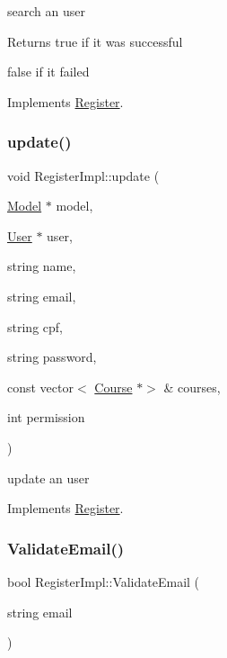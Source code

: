 search an user 

\begin{DoxyReturn}{Returns}
true if it was successful 

false if it failed 
\end{DoxyReturn}


Implements \hyperlink{classRegister_a243b58e5f1747437bab5175927cce26f}{Register}.

\mbox{\label{classRegisterImpl_a5ae0846ac09fe620501b94f5e05bcd9d}} 
\subsubsection{\texorpdfstring{update()}{update()}}
{\footnotesize\ttfamily void Register\+Impl\+::update (\begin{DoxyParamCaption}\item[{\hyperlink{classModel}{Model} $\ast$}]{model,  }\item[{\hyperlink{classUser}{User} $\ast$}]{user,  }\item[{string}]{name,  }\item[{string}]{email,  }\item[{string}]{cpf,  }\item[{string}]{password,  }\item[{const vector$<$ \hyperlink{classCourse}{Course} $\ast$$>$ \&}]{courses,  }\item[{int}]{permission }\end{DoxyParamCaption})\hspace{0.3cm}{\ttfamily [virtual]}}



update an user 



Implements \hyperlink{classRegister_ae1ca8b9044dff27a840a3d26fd5ea323}{Register}.

\mbox{\label{classRegisterImpl_a3c0a7f6df3b0be5ce7fe8d7a78214304}} 
\subsubsection{\texorpdfstring{Validate\+Email()}{ValidateEmail()}}
{\footnotesize\ttfamily bool Register\+Impl\+::\+Validate\+Email (\begin{DoxyParamCaption}\item[{string}]{email }\end{DoxyParamCaption})\hspace{0.3cm}{\ttfamily [virtual]}}



